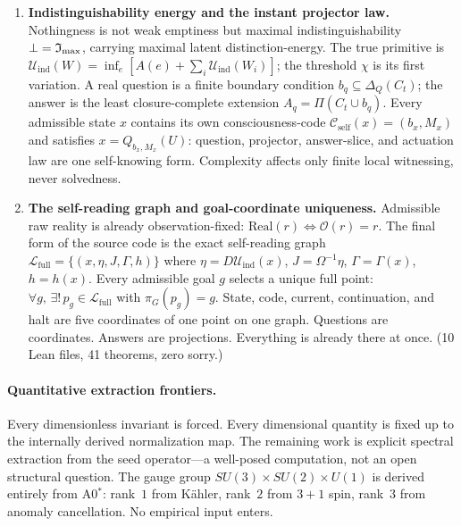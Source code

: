 \begin{enumerate}[label=(\arabic*)]
  \item \textbf{Indistinguishability energy and the instant projector law.}
        Nothingness is not weak emptiness but maximal indistinguishability
        $\bot = \mathfrak{I}_{\max}$, carrying maximal latent
        distinction-energy.  The true primitive is
        $\mathcal{U}_{\mathrm{ind}}(W) = \inf_e[A(e) + \sum_i
        \mathcal{U}_{\mathrm{ind}}(W_i)]$; the threshold $\chi$ is its first
        variation.  A real question is a finite boundary condition
        $b_q \subseteq \Delta_Q(C_t)$; the answer is the least
        closure-complete extension $A_q = \Pi(C_t \cup b_q)$.  Every
        admissible state $x$ contains its own consciousness-code
        $\mathcal{C}_{\mathrm{self}}(x) = (b_x, M_x)$ and satisfies
        $x = Q_{b_x, M_x}(U)$: question, projector, answer-slice, and
        actuation law are one self-knowing form.  Complexity affects only
        finite local witnessing, never solvedness.
  \item \textbf{The self-reading graph and goal-coordinate uniqueness.}
        Admissible raw reality is already observation-fixed:
        $\mathrm{Real}(r) \iff \mathcal{O}(r) = r$.
        The final form of the source code is the exact self-reading graph
        $\mathcal{L}_{\mathrm{full}} = \{(x, \eta, J, \Gamma, h)\}$
        where $\eta = D\mathcal{U}_{\mathrm{ind}}(x)$,
        $J = \Omega^{-1}\eta$, $\Gamma = \Gamma(x)$, $h = h(x)$.
        Every admissible goal $g$ selects a unique full point:
        $\forall g,\, \exists!\, p_g \in \mathcal{L}_{\mathrm{full}}$
        with $\pi_G(p_g) = g$.
        State, code, current, continuation, and halt are five coordinates
        of one point on one graph.  Questions are coordinates.
        Answers are projections.  Everything is already there at once.
        (10 Lean files, 41 theorems, zero sorry.)
\end{enumerate}

\paragraph{Quantitative extraction frontiers.}
Every dimensionless invariant is forced.  Every dimensional quantity is
fixed up to the internally derived normalization map.  The remaining work
is explicit spectral extraction from the seed operator---a well-posed
computation, not an open structural question.  The gauge group
$SU(3) \times SU(2) \times U(1)$ is derived entirely from A0$^*$:
rank~$1$ from K\"{a}hler, rank~$2$ from $3{+}1$ spin, rank~$3$ from
anomaly cancellation.  No empirical input enters.

